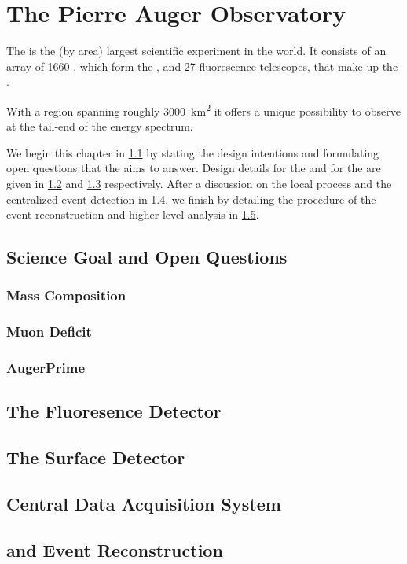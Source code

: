 
\chapter{The Pierre Auger Observatory}
\label{chap:pierre-auger-observatory}

The \PAO is the (by area) largest scientific experiment in the world. It 
consists of an array of 1660 \WCDs, which form the \SD, and 27 fluorescence 
telescopes, that make up the \FD.

With a region spanning roughly \SI{3000}{\kilo\meter\squared} it offers a unique
possibility to observe \UHECRs at the tail-end of the \CR energy spectrum. 

We begin this chapter in \cref{sec:science-case} by stating the design 
intentions and formulating open questions that the \PAO aims to answer. Design
details for the \FD and for the \SD are given in \cref{sec:fd} and \cref{sec:sd} 
respectively. After a discussion on the local \DAQ process and the centralized 
event detection in \cref{sec:cdas}, we finish by detailing the procedure of the
event reconstruction and higher level analysis in \cref{sec:rec}.

\section{Science Goal and Open Questions}
\label{sec:science-case}

\subsection{Mass Composition}
\subsection{Muon Deficit}
\subsection{AugerPrime}

\section{The Fluoresence Detector}
\label{sec:fd}



\section{The Surface Detector}
\label{sec:sd}



\section{Central Data Acquisition System}
\label{sec:cdas}



\section{\Offline and Event Reconstruction}
\label{sec:rec}

